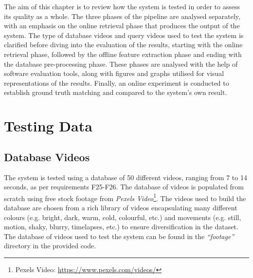 The aim of this chapter is to review how the system is tested in order to assess its quality as a whole. The three phases of the pipeline are analysed separately, with an emphasis on the online retrieval phase that produces the output of the system. The type of database videos and query videos used to test the system is clarified before diving into the evaluation of the results, starting with the online retrieval phase, followed by the offline feature extraction phase and ending with the database pre-processing phase. These phases are analysed with the help of software evaluation tools, along with figures and graphs utilised for visual representations of the results. Finally, an online experiment is conducted to establish ground truth matching and compared to the system's own result.


\section{Testing Data}

\subsection{Database Videos}

The system is tested using a database of 50 different videos, ranging from 7 to 14 seconds, as per requirements F25-F26. The database of videos is populated from scratch using free stock footage from \textit{Pexels Video}\footnote{Pexels Video: \url{https://www.pexels.com/videos/}}. The videos used to build the database are chosen from a rich library of videos encapsulating many different colours (e.g. bright, dark, warm, cold, colourful, etc.) and movements (e.g. still, motion, shaky, blurry, timelapses, etc.) to ensure diversification in the dataset. The database of videos used to test the system can be found in the \textit{``footage''} directory in the provided code.\\

